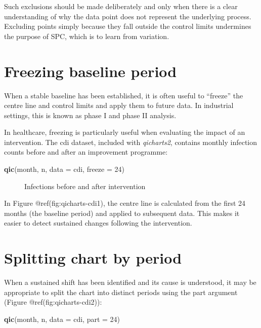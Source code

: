 \documentclass[
]{book}
\makeatletter
\newenvironment{Shaded}{\begin{snugshade}}{\end{snugshade}}
\newcommand{\AttributeTok}[1]{\textcolor[rgb]{0.13,0.29,0.53}{#1}}
\newcommand{\DecValTok}[1]{\textcolor[rgb]{0.00,0.00,0.81}{#1}}
\newcommand{\FunctionTok}[1]{\textcolor[rgb]{0.13,0.29,0.53}{\textbf{#1}}}
\newcommand{\NormalTok}[1]{#1}
\newcommand*\pandocbounded[1]{%
  \sbox\pandoc@box{#1}%
  \Gscale@div\@tempa{\textheight}{\dimexpr\ht\pandoc@box+\dp\pandoc@box\relax}%
  \Gscale@div\@tempb{\linewidth}{\wd\pandoc@box}%
  \ifdim\@tempb\p@<\@tempa\p@\let\@tempa\@tempb\fi%
  \ifdim\@tempa\p@<\p@\scalebox{\@tempa}{\usebox\pandoc@box}%
  \else\usebox{\pandoc@box}%
  \fi%
}
\makeatother
\begin{document}
Such exclusions should be made deliberately and only when there is a
clear understanding of why the data point does not represent the
underlying process. Excluding points simply because they fall outside
the control limits undermines the purpose of SPC, which is to learn from
variation.

\section{Freezing baseline period}\label{freezing-baseline-period}

When a stable baseline has been established, it is often useful to
``freeze'' the centre line and control limits and apply them to future
data. In industrial settings, this is known as phase I and phase II
analysis.

In healthcare, freezing is particularly useful when evaluating the
impact of an intervention. The cdi dataset, included with
\emph{qicharts2}, contains monthly infection counts before and after an
improvement programme:

\begin{Shaded}
\begin{Highlighting}[]
\FunctionTok{qic}\NormalTok{(month, n, }\AttributeTok{data =}\NormalTok{ cdi, }\AttributeTok{freeze =} \DecValTok{24}\NormalTok{)}
\end{Highlighting}
\end{Shaded}

\begin{figure}
\centering
\pandocbounded{}
\caption{Infections before and after intervention}
\end{figure}

In Figure @ref(fig:qicharts-cdi1), the centre line is calculated from
the first 24 months (the baseline period) and applied to subsequent
data. This makes it easier to detect sustained changes following the
intervention.

\section{Splitting chart by period}\label{splitting-chart-by-period}

When a sustained shift has been identified and its cause is understood,
it may be appropriate to split the chart into distinct periods using the
part argument (Figure @ref(fig:qicharts-cdi2)):

\begin{Shaded}
\begin{Highlighting}[]
\FunctionTok{qic}\NormalTok{(month, n, }\AttributeTok{data =}\NormalTok{ cdi, }\AttributeTok{part =} \DecValTok{24}\NormalTok{)}
\end{Highlighting}
\end{Shaded}
\end{document}
